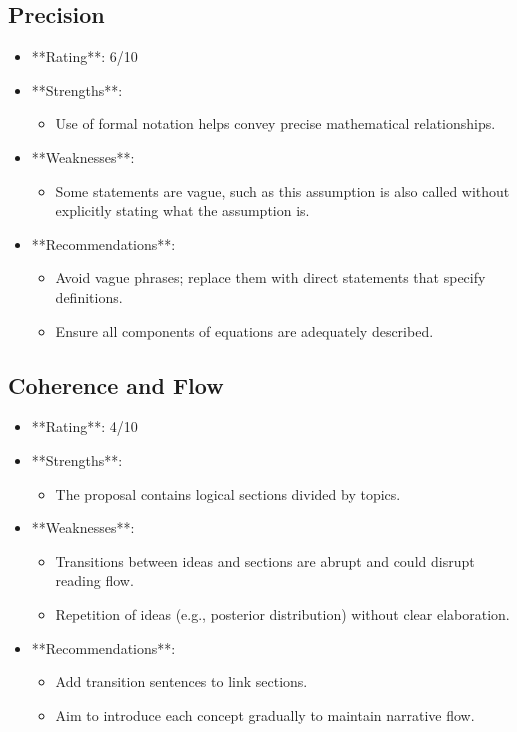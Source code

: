 \documentclass[11pt]{article}
\begin{document}
\subsection{Precision}
\begin{itemize}
    \item **Rating**: 6/10
    \item **Strengths**:
        \begin{itemize}
            \item Use of formal notation helps convey precise mathematical relationships.
        \end{itemize}
    \item **Weaknesses**:
        \begin{itemize}
            \item Some statements are vague, such as this assumption is also called without explicitly stating what the assumption is.
        \end{itemize}
    \item **Recommendations**:
        \begin{itemize}
            \item Avoid vague phrases; replace them with direct statements that specify definitions.
            \item Ensure all components of equations are adequately described.
        \end{itemize}
\end{itemize}

\subsection{Coherence and Flow}
\begin{itemize}
    \item **Rating**: 4/10
    \item **Strengths**:
        \begin{itemize}
            \item The proposal contains logical sections divided by topics.
        \end{itemize}
    \item **Weaknesses**:
        \begin{itemize}
            \item Transitions between ideas and sections are abrupt and could disrupt reading flow.
            \item Repetition of ideas (e.g., posterior distribution) without clear elaboration.
        \end{itemize}
    \item **Recommendations**:
        \begin{itemize}
            \item Add transition sentences to link sections.
            \item Aim to introduce each concept gradually to maintain narrative flow.
        \end{itemize}
\end{itemize}
\end{document}
